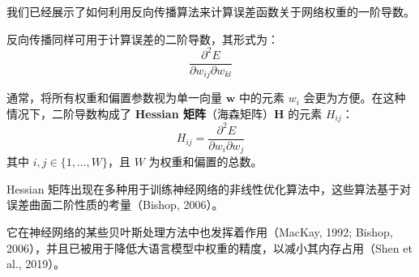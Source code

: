 \documentclass{article}
\begin{document}
{\color{red}

我们已经展示了如何利用反向传播算法来计算误差函数关于网络权重的一阶导数。

反向传播同样可用于计算误差的二阶导数，其形式为：
\begin{equation}
    \frac{\partial^2 E}{\partial w_{ij} \partial w_{kl}}
    \tag{8.36}
\end{equation}

通常，将所有权重和偏置参数视为单一向量 $\mathbf{w}$ 中的元素 $w_i$ 会更为方便。在这种情况下，二阶导数构成了 \textbf{Hessian 矩阵}（海森矩阵）$\mathbf{H}$ 的元素 $H_{ij}$：
\begin{equation}
    H_{ij} = \frac{\partial^2 E}{\partial w_i \partial w_j}
    \tag{8.37}
\end{equation}
其中 $i, j \in \{1, \ldots, W\}$，且 $W$ 为权重和偏置的总数。

Hessian 矩阵出现在多种用于训练神经网络的非线性优化算法中，这些算法基于对误差曲面二阶性质的考量（Bishop, 2006）。

它在神经网络的某些贝叶斯处理方法中也发挥着作用（MacKay, 1992; Bishop, 2006），并且已被用于降低大语言模型中权重的精度，以减小其内存占用（Shen et al., 2019）。
}
\end{document}

